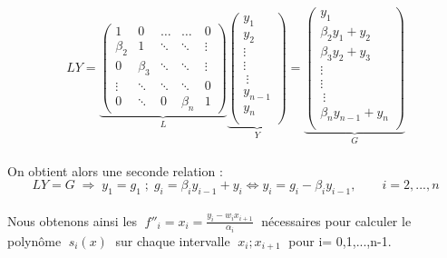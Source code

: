 \documentclass{article}
\begin{document}
\[LY=\underbrace{\begin{pmatrix}
	1 & 0 & \ldots & \ldots & 0 \\
	\beta_2 & 1 & \ddots & \ddots & \vdots \\
	0 & \beta_3 & \ddots & \ddots & \vdots \\ 
	\vdots & \ddots & \ddots & \ddots & 0\\
	0 & \ddots & 0 & \beta_n & 1
	\end{pmatrix}
}_{L}
\underbrace{
	\begin{pmatrix}
	y_1 \\
	y_2 \\
	\vdots\\
	\vdots\\\
	\vdots\\
	y_{n-1} \\
	y_n \\
	\end{pmatrix}
}_{Y}
= 
\underbrace{
	\begin{pmatrix}
	y_1 \\
	\beta_2y_1+y_2 \\
	\beta_3y_2+y_3 \\
	\vdots\\
	\vdots\\\
	\vdots\\
	\beta_ny_{n-1}+y_n \\
	\end{pmatrix}
}_{G}\]
\\
On obtient alors une seconde relation :
\\
\[LY=G \; \Rightarrow \; y_1=g_1 \; ; \; g_i=\beta_{i}y_{i-1}+y_i \Leftrightarrow y_i=g_i-\beta_{i}y_{i-1}, \qquad i=2,...,n\]
\\
Nous obtenons ainsi les $\; f''_i=x_i=\frac{y_i-w_{i}x_{i+1}}{\alpha_i} \;$ n\'{e}cessaires pour calculer le
\\[5pt]
polyn\^{o}me $\; s_i(x) \;$ sur chaque intervalle $\; x_i;x_{i+1} \;$  pour i= 0,1,...,n-1.

\newpage
\end{document}
